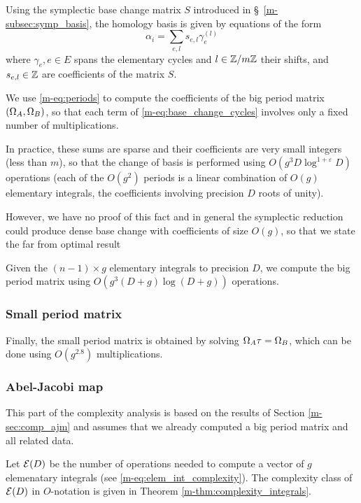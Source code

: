 \documentclass[main.tex]{subfiles}
\begin{document}
   Using the symplectic base change matrix $S$ introduced
   in \S~\ref{m-subsec:symp_basis}, the homology basis is given
   by equations of the form
   \begin{equation*}
       \label{eq:base_change_cycles}
       \alpha_i = \sum_{e,l} s_{e,l}\gamma_e^{(l)}
   \end{equation*}
   where $\gamma_e,e\in E$ spans the elementary cycles
   and $l\in\mathbb{Z}/m\mathbb{Z}$ their shifts,
   and $s_{e,l}\in\mathbb{Z}$ are coefficients of the matrix $S$.

   We use \eqref{m-eq:periods} to compute the coefficients of the big period
   matrix $(\Omega_A,\Omega_B)$, so that each term of \eqref{m-eq:base_change_cycles}
   involves only a fixed number of multiplications.

   In practice, these sums are sparse and their coefficients are very small integers
   (less than $m$), so that the change of basis is performed using
   $O(g^3D\log^{1+\varepsilon}D)$ operations
   (each of the $O(g^2)$ periods is a linear combination of $O(g)$ elementary integrals,
   the coefficients involving precision $D$ roots of unity).

   However, we have no proof of this fact and in general the symplectic reduction
   could produce dense base change with coefficients of size $O(g)$,
   so that we state the far from optimal result
   \begin{thm}
       Given the $(n-1)\times g$ elementary integrals to precision $D$,
       we compute the big period matrix using $O(g^3(D+g)\log(D+g))$ operations.
   \end{thm}

   \subsubsection{Small period matrix}

   Finally, the small period matrix is obtained by solving $\Omega_A\tau=\Omega_B$,
   which can be done using $O(g^{2.8})$ multiplications.

   \subsubsection{Abel-Jacobi map}

  This part of the complexity analysis is based on the results of Section \ref{m-sec:comp_ajm} and assumes that we already computed a big period matrix and all related data.

  Let $\mathcal E(D)$ be the number of operations needed to compute a vector of $g$ elemenatary integrals  (see \eqref{m-eq:elem_int_complexity}). The complexity class of $\mathcal E(D)$ in $O$-notation is given in
  Theorem \ref{m-thm:complexity_integrals}.
\end{document}
